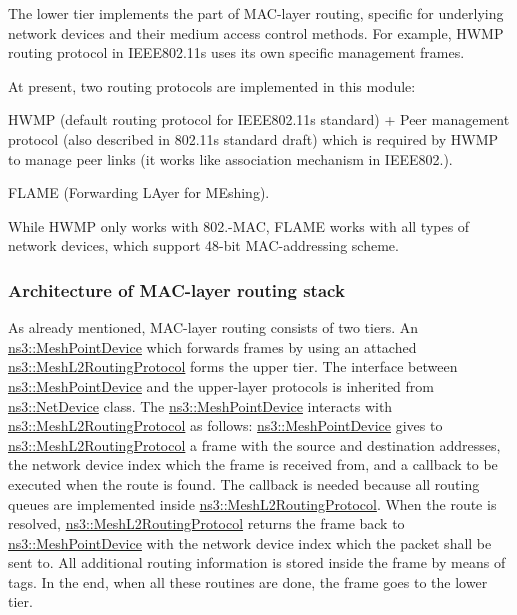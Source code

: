 The lower tier implements the part of M\+A\+C-\/layer routing, specific for underlying network devices and their medium access control methods. For example, H\+W\+MP routing protocol in I\+E\+E\+E802.\+11s uses its own specific management frames.

At present, two routing protocols are implemented in this module\+:
\begin{DoxyItemize}
\item H\+W\+MP (default routing protocol for I\+E\+E\+E802.\+11s standard) + Peer management protocol (also described in 802.\+11s standard draft) which is required by H\+W\+MP to manage peer links (it works like association mechanism in I\+E\+E\+E802.).
\item F\+L\+A\+ME (Forwarding L\+Ayer for M\+Eshing).
\end{DoxyItemize}

While H\+W\+MP only works with 802.-\/\+M\+AC, F\+L\+A\+ME works with all types of network devices, which support 48-\/bit M\+A\+C-\/addressing scheme.\hypertarget{group__mesh_Architecture}{}\subsubsection{Architecture of M\+A\+C-\/layer routing stack}\label{group__mesh_Architecture}
As already mentioned, M\+A\+C-\/layer routing consists of two tiers. An \hyperlink{classns3_1_1MeshPointDevice}{ns3\+::\+Mesh\+Point\+Device} which forwards frames by using an attached \hyperlink{classns3_1_1MeshL2RoutingProtocol}{ns3\+::\+Mesh\+L2\+Routing\+Protocol} forms the upper tier. The interface between \hyperlink{classns3_1_1MeshPointDevice}{ns3\+::\+Mesh\+Point\+Device} and the upper-\/layer protocols is inherited from \hyperlink{classns3_1_1NetDevice}{ns3\+::\+Net\+Device} class. The \hyperlink{classns3_1_1MeshPointDevice}{ns3\+::\+Mesh\+Point\+Device} interacts with \hyperlink{classns3_1_1MeshL2RoutingProtocol}{ns3\+::\+Mesh\+L2\+Routing\+Protocol} as follows\+: \hyperlink{classns3_1_1MeshPointDevice}{ns3\+::\+Mesh\+Point\+Device} gives to \hyperlink{classns3_1_1MeshL2RoutingProtocol}{ns3\+::\+Mesh\+L2\+Routing\+Protocol} a frame with the source and destination addresses, the network device index which the frame is received from, and a callback to be executed when the route is found. The callback is needed because all routing queues are implemented inside \hyperlink{classns3_1_1MeshL2RoutingProtocol}{ns3\+::\+Mesh\+L2\+Routing\+Protocol}. When the route is resolved, \hyperlink{classns3_1_1MeshL2RoutingProtocol}{ns3\+::\+Mesh\+L2\+Routing\+Protocol} returns the frame back to \hyperlink{classns3_1_1MeshPointDevice}{ns3\+::\+Mesh\+Point\+Device} with the network device index which the packet shall be sent to. All additional routing information is stored inside the frame by means of tags. In the end, when all these routines are done, the frame goes to the lower tier.

